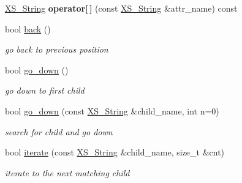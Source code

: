 \begin{DoxyCompactItemize}
\mbox{\label{struct_x_m_l_storage_1_1const___x_m_l_pos_ad23e75103a8538c1cf7233c0be22dded}} 
\hyperlink{struct_x_m_l_storage_1_1_x_s___string}{X\+S\+\_\+\+String} {\bfseries operator\mbox{[}$\,$\mbox{]}} (const \hyperlink{struct_x_m_l_storage_1_1_x_s___string}{X\+S\+\_\+\+String} \&attr\+\_\+name) const
\item 
\mbox{\label{struct_x_m_l_storage_1_1const___x_m_l_pos_a04e186563b2badd425349f48b0aa15fa}} 
bool \hyperlink{struct_x_m_l_storage_1_1const___x_m_l_pos_a04e186563b2badd425349f48b0aa15fa}{back} ()
\begin{DoxyCompactList}\small\item\em go back to previous position \end{DoxyCompactList}\item 
\mbox{\label{struct_x_m_l_storage_1_1const___x_m_l_pos_aa39d9c09a03c7a366a77d9ec8f09d1bb}} 
bool \hyperlink{struct_x_m_l_storage_1_1const___x_m_l_pos_aa39d9c09a03c7a366a77d9ec8f09d1bb}{go\+\_\+down} ()
\begin{DoxyCompactList}\small\item\em go down to first child \end{DoxyCompactList}\item 
\mbox{\label{struct_x_m_l_storage_1_1const___x_m_l_pos_ad324c271e470445d1b0bf60cf428b66c}} 
bool \hyperlink{struct_x_m_l_storage_1_1const___x_m_l_pos_ad324c271e470445d1b0bf60cf428b66c}{go\+\_\+down} (const \hyperlink{struct_x_m_l_storage_1_1_x_s___string}{X\+S\+\_\+\+String} \&child\+\_\+name, int n=0)
\begin{DoxyCompactList}\small\item\em search for child and go down \end{DoxyCompactList}\item 
\mbox{\label{struct_x_m_l_storage_1_1const___x_m_l_pos_a314b2bc98cd54756e9776202365f3978}} 
bool \hyperlink{struct_x_m_l_storage_1_1const___x_m_l_pos_a314b2bc98cd54756e9776202365f3978}{iterate} (const \hyperlink{struct_x_m_l_storage_1_1_x_s___string}{X\+S\+\_\+\+String} \&child\+\_\+name, size\+\_\+t \&cnt)
\begin{DoxyCompactList}\small\item\em iterate to the next matching child \end{DoxyCompactList}\item 

\end{DoxyCompactItemize}
